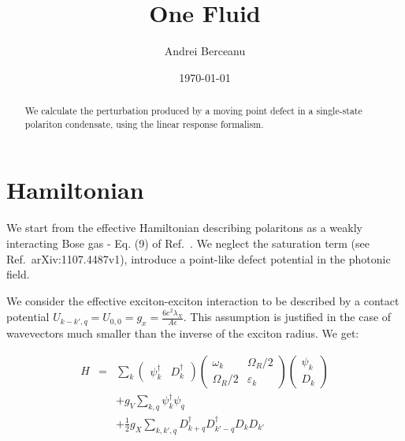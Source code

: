 \documentclass[a4paper,prb,10pt,aps,twocolumn]{revtex4-1}
\begin{document}
\title{One Fluid}
\author{Andrei Berceanu}

\date{\today}

\begin{abstract}
We calculate the perturbation produced by a moving point defect in a single-state polariton condensate, using the linear response formalism.
\end{abstract}

\maketitle

\section{Hamiltonian}
We start from the effective Hamiltonian describing polaritons as a
weakly interacting Bose gas - Eq. (9) of Ref.~\cite{Keeling_2007}. 
We neglect the saturation term (see Ref.~arXiv:1107.4487v1),
introduce a point-like defect potential in the photonic field.

We consider the effective exciton-exciton interaction to be described
by a contact potential
$U_{k-k',q}=U_{0,0}=g_{x}=\frac{6e^{2}\lambda_{X}}{A\epsilon}$.  This
assumption is justified in the case of wavevectors much smaller than
the inverse of the exciton radius. We get:

\begin{eqnarray}
H & = & \sum_{k}\left(\begin{array}{cc}
\psi_{k}^{\dagger} & D_{k}^{\dagger}\end{array}\right)\left(\begin{array}{cc}
\omega_{k} & \Omega_{R}/2\\
\Omega_{R}/2 & \varepsilon_{k}
\end{array}\right)\left(\begin{array}{c}
\psi_{k}\\
D_{k}
\end{array}\right)\nonumber \\
 &  & +g_{V}\sum_{k,q}\psi_{k}^{\dagger}\psi_{q}\nonumber \\
 &  & +\frac{1}{2}g_{X}\sum_{k,k',q}D_{k+q}^{\dagger}D_{k'-q}^{\dagger}D_{k}D_{k'}\label{eq:ham}
\end{eqnarray}
\end{document}
